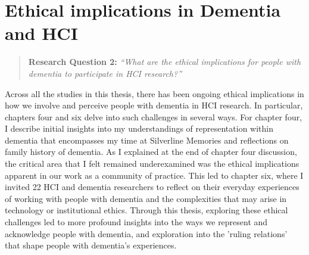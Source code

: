 \section{Ethical implications in Dementia and HCI}
\label{Discussion:RQ2}
\begin{quote}
\textbf{    Research Question 2:
}    
\textit{    “What are the ethical implications for people with dementia to participate in HCI research?”}
\end{quote}
Across all the studies in this thesis, there has been ongoing ethical implications in how we involve and perceive people with dementia in HCI research. In particular, chapters four and six delve into such challenges in several ways. For chapter four,  I describe initial insights into my understandings of representation within dementia that encompasses my time at Silverline Memories and reflections on family history of dementia. As I explained at the end of chapter four discussion, the critical area that I felt remained underexamined was the ethical implications apparent in our work as a community of practice. This led to chapter six, where I invited 22 HCI and dementia researchers to reflect on their everyday experiences of working with people with dementia and the complexities that may arise in technology or institutional ethics. Through this thesis, exploring these ethical challenges led to more profound insights into the ways we represent and acknowledge people with dementia, and exploration into the 'ruling relations' that shape people with dementia's experiences. 

